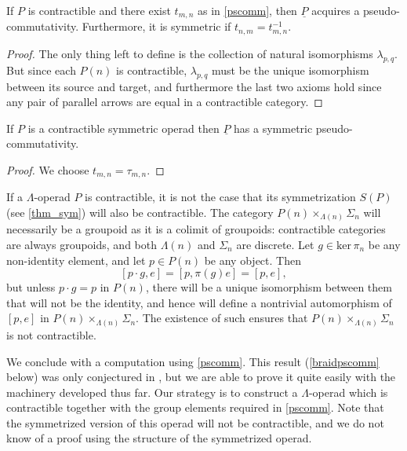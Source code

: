 \begin{cor}
If $P$ is contractible and there exist $t_{m,n}$ as in \cref{pscomm}, then $\underline{P}$ acquires a pseudo-commutativity. Furthermore, it is symmetric if $t_{n,m} = t_{m,n}^{-1}$.
\end{cor}
\begin{proof}
The only thing left to define is the collection of natural isomorphisms $\lambda_{p,q}$. But since each $P(n)$ is contractible, $\lambda_{p,q}$ must be the unique isomorphism between its source and target, and furthermore the last two axioms hold since any pair of parallel arrows are equal in a contractible category.
\end{proof}

\begin{cor}
If $P$ is a contractible symmetric operad then $\underline{P}$ has a symmetric pseudo-commutativity.
\end{cor}
\begin{proof}
We choose $t_{m,n} = \tau_{m,n}$.
\end{proof}

\begin{rem}
If a $\Lambda$-operad $P$ is contractible, it is not the case that its symmetrization $S(P)$ (see \cref{thm_sym}) will also be contractible. The category $P(n) \times_{\Lambda(n)} \Sigma_{n}$ will necessarily be a groupoid as it is a colimit of groupoids: contractible categories are always groupoids, and both $\Lambda(n)$ and $\Sigma_{n}$ are discrete. Let $g \in \textrm{ker} \, \pi_{n}$ be any non-identity element, and let $p \in P(n)$ be any object. Then
  \[
    [p \cdot g, e] = [p, \pi(g)e] = [p,e],
  \]
but unless $p\cdot g = p$ in $P(n)$, there will be a unique isomorphism between them that will not be the identity, and hence will define a nontrivial automorphism of $[p,e]$ in  $P(n) \times_{\Lambda(n)} \Sigma_{n}$. The existence of such ensures that $P(n) \times_{\Lambda(n)} \Sigma_{n}$ is not contractible.
\end{rem}


We conclude with a computation using \cref{pscomm}. This result (\ref{braidpscomm} below) was only conjectured in \cite{HP}, but we are able to prove it quite easily with the machinery developed thus far. Our strategy is to construct a $\Lambda$-operad which is contractible together with the group elements required in \cref{pscomm}. Note that the symmetrized version of this operad will not be contractible, and we do not know of a proof using the structure of the symmetrized operad.

